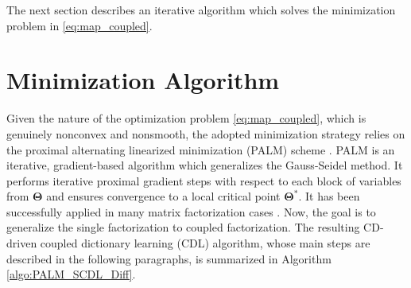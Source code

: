 \documentclass[review]{elsarticle}
\begin{document}
The next section describes an iterative algorithm which solves the minimization problem in \eqref{eq:map_coupled}.

\section{Minimization Algorithm}
\label{sec:min_alg}

Given the nature of the optimization problem \eqref{eq:map_coupled}, which is genuinely nonconvex and nonsmooth, the adopted minimization strategy relies on the proximal alternating linearized minimization (PALM) scheme \citep{bolte_proximal_2014}. PALM is an iterative, gradient-based algorithm which generalizes the Gauss-Seidel method. It performs iterative proximal gradient steps with respect to each block of variables from $\boldsymbol{\Theta}$ and ensures convergence to a local critical point $\boldsymbol{\Theta}^{*}$. It has been successfully applied in many matrix factorization cases \citep{bolte_proximal_2014,cavalcanti_unmixing_2017,thouvenin_online_2016}. Now, the goal is to generalize the single factorization to coupled factorization. The resulting CD-driven coupled dictionary learning (CDL) algorithm, whose main steps are described in the following paragraphs, is summarized in Algorithm \ref{algo:PALM_SCDL_Diff}.
\end{document}
